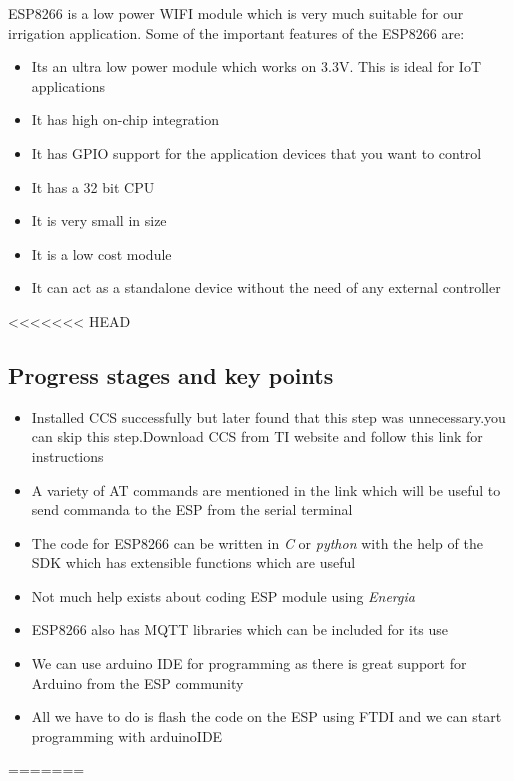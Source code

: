 \documentclass[16pt]{article}
\begin{document}
ESP8266 is a low power WIFI module which is very much suitable for our
irrigation application. Some of the important features of the ESP8266
are:


\begin{itemize}

\item
  Its an ultra low power module which works on 3.3V. This is ideal for
  IoT applications
\item
  It has high on-chip integration
\item
  It has GPIO support for the application devices that you want to
  control
\item
  It has a 32 bit CPU
\item
  It is very small in size
\item
  It is a low cost module
\item
  It can act as a standalone device without the need of any external
  controller
\end{itemize}

<<<<<<< HEAD

\subsection{Progress stages and key points}

\begin{itemize}

\item
  Installed CCS successfully but later found that this step was unnecessary.you can skip this step.Download CCS from TI website and follow this link for instructions
\item
  A variety of AT commands are mentioned in the link which will be
  useful to send commanda to the ESP from the serial terminal
\item
  The code for ESP8266 can be written in \emph{C} or \emph{python} with
  the help of the SDK which has extensible functions which are useful
\item
  Not much help exists about coding ESP module using \emph{Energia}  
\item
  ESP8266 also has MQTT libraries which can be included for its use
\item
  We can use arduino IDE for programming as there is great support for
  Arduino from the ESP community
\item
  All we have to do is flash the code on the ESP using FTDI and we can
  start programming with arduinoIDE
  
\end{itemize}
=======
\end{document}
